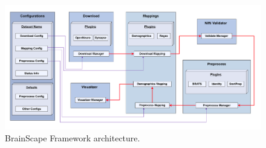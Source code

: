 \begin{figure}[htbp]\begin{center}\includegraphics[width=\linewidth]{figures/architecture.png}
    \caption{
        BrainScape Framework architecture.
    }
    \label{fig:SystemArchitecture}\end{center}
\end{figure}

